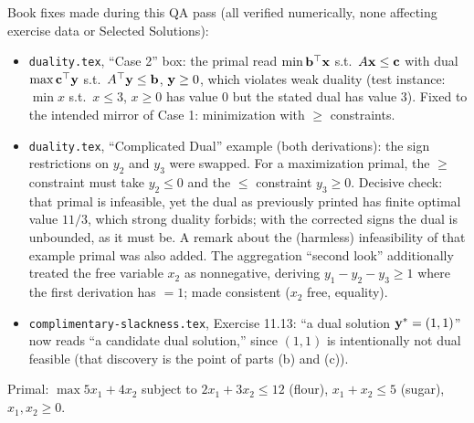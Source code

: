 \begin{qaflag}
Book fixes made during this QA pass (all verified numerically, none affecting exercise data or Selected Solutions):
\begin{itemize}
\item \texttt{duality.tex}, ``Case 2'' box: the primal read $\min \mathbf{b}^\top \mathbf{x}$ s.t.\ $A\mathbf{x} \le \mathbf{c}$ with dual $\max \mathbf{c}^\top \mathbf{y}$ s.t.\ $A^\top\mathbf{y} \le \mathbf{b}$, $\mathbf{y} \ge 0$, which violates weak duality (test instance: $\min x$ s.t.\ $x \le 3$, $x \ge 0$ has value $0$ but the stated dual has value $3$). Fixed to the intended mirror of Case 1: minimization with $\geq$ constraints.
\item \texttt{duality.tex}, ``Complicated Dual'' example (both derivations): the sign restrictions on $y_2$ and $y_3$ were swapped. For a maximization primal, the $\geq$ constraint must take $y_2 \le 0$ and the $\leq$ constraint $y_3 \ge 0$. Decisive check: that primal is infeasible, yet the dual as previously printed has finite optimal value $11/3$, which strong duality forbids; with the corrected signs the dual is unbounded, as it must be. A remark about the (harmless) infeasibility of that example primal was also added. The aggregation ``second look'' additionally treated the free variable $x_2$ as nonnegative, deriving $y_1 - y_2 - y_3 \ge 1$ where the first derivation has $= 1$; made consistent ($x_2$ free, equality).
\item \texttt{complimentary-slackness.tex}, Exercise 11.13: ``a dual solution $\mathbf{y}^* = (1,1)$'' now reads ``a candidate dual solution,'' since $(1,1)$ is intentionally not dual feasible (that discovery is the point of parts (b) and (c)).
\end{itemize}
\end{qaflag}


Primal: $\max 5x_1 + 4x_2$ subject to $2x_1 + 3x_2 \le 12$ (flour), $x_1 + x_2 \le 5$ (sugar), $x_1, x_2 \ge 0$.

